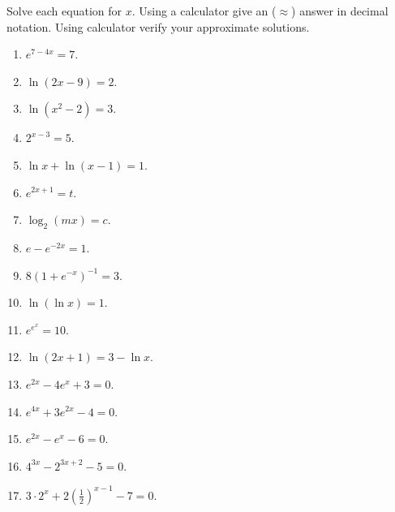Solve each equation for $x$. Using a calculator give an ($\approx$) answer in decimal notation. Using calculator verify your approximate solutions.
\begin{multicols}{2}
\begin{enumerate}[ref={\fcProblemRef}]
\item $e^{7-4x}=7$.

\item $\ln (2x-9)=2$.

\item $\ln (x^2-2)=3$.

\item $2^{x-3}=5$.

\item \label{problemlnx+ln(x-1)=1} $\ln x+\ln (x-1)=1$.

\item $e^{2x+1}=t$.

\item $\log_2(m x)=c$.

\item $e- e^{-2x}=1$.

\item $8(1+e^{-x})^{-1}=3$.

\item $\ln (\ln x)=1$.

\item $e^{e^x}=10$.

\item $\ln(2x+1)=3-\ln x$.

\item $e^{2x}-4e^x+3=0$.


\item $e^{4x}+3e^{2x}-4=0$. 

\item $e^{2x}-e^x-6=0$.

\item $4^{3x}-2^{3x+2}-5=0$. 

\item $3\cdot 2^{x}+2 \left(\frac{1}{2}\right)^{x-1}-7=0$. 

\end{enumerate}
\end{multicols}

